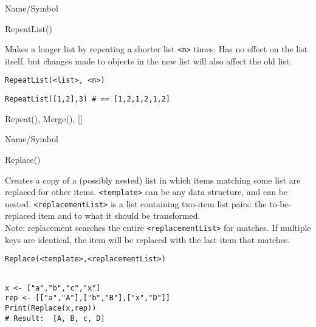 \rl


\begin{desc}{Name/Symbol}
\item[Name/Symbol] 	RepeatList()

\item[Description]  	Makes a longer list by repeating a shorter list \verb+<n>+ times. 
	Has no effect on the list itself, but changes made to objects 
	in the new list will also affect the old list.

\item[Usage]       	
\begin{verbatim}
RepeatList(<list>, <n>)
\end{verbatim}

\item[Example]     	
\begin{verbatim}
RepeatList([1,2],3) # == [1,2,1,2,1,2]
\end{verbatim}

\item[See Also]    	Repeat(), Merge(), []
\end{desc}

\rl


\begin{desc}{Name/Symbol}
\item[Name/Symbol]  	Replace()

\item[Description]  	Creates a copy of a (possibly nested) list in which
		items matching some list are replaced for other items.  
		\verb+<template>+ can be any data structure, and can be nested.  
		\verb+<replacementList>+ is a list containing two-item list pairs:
		the to-be-replaced item and to what it should be transformed.\\
		Note: replacement searches the entire \verb+<replacementList>+ for 
		matches.  If multiple keys are identical, the item will be 
		replaced with the last item that matches.

\item[Usage]        	
\begin{verbatim}
Replace(<template>,<replacementList>)
\end{verbatim}
			  
\item[Example]     	
\begin{verbatim}

x <- ["a","b","c","x"]
rep <- [["a","A"],["b","B"],["x","D"]]
Print(Replace(x,rep))
# Result:  [A, B, c, D] 
\end{verbatim}

\item[See Also]	
\end{desc}

